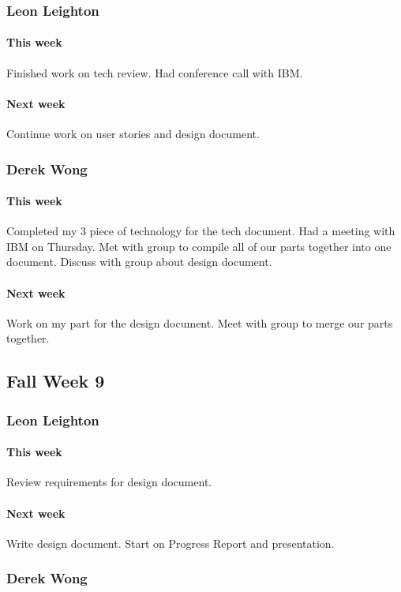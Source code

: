 \documentclass[10pt,letterpaper,onecolumn,draftclsnofoot]{IEEEtran}
\begin{document}
\subsubsection{Leon Leighton}
\paragraph{This week}Finished work on tech review. Had conference call with IBM.
\paragraph{Next week}Continue work on user stories and design document.

\subsubsection{Derek Wong}
\paragraph{This week}Completed my 3 piece of technology for the tech document.                     
Had a meeting with IBM on Thursday.               
Met with group to compile all of our parts together into one document.                
Discuss with group about design document.
\paragraph{Next week}Work on my part for the design document.                       
Meet with group to merge our parts together.

\subsection{Fall Week 9}
\subsubsection{Leon Leighton}
\paragraph{This week}Review requirements for design document.
\paragraph{Next week}Write design document. Start on Progress Report and presentation.

\subsubsection{Derek Wong}
\end{document}
